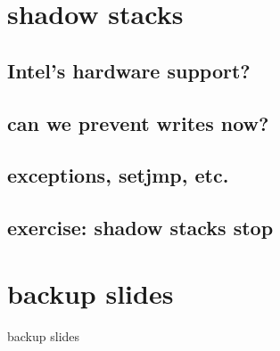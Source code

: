 \section{shadow stacks}


\subsection{Intel's hardware support?}


\subsection{can we prevent writes now?}


\subsection{exceptions, setjmp, etc.}


\subsection{exercise: shadow stacks stop}




\section{backup slides}
\begin{frame}{backup slides}
\end{frame}


